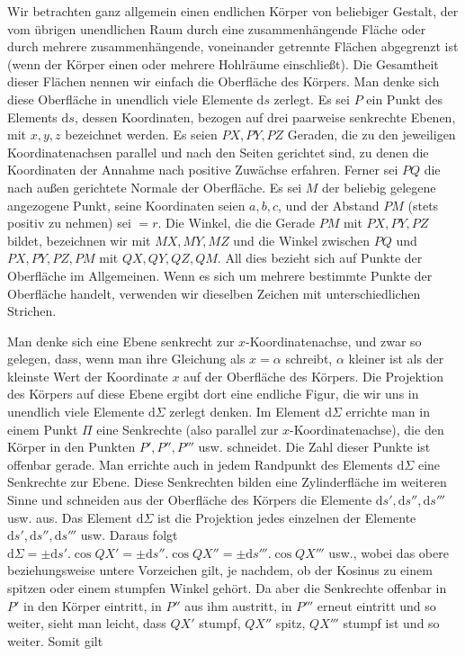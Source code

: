 \par
Wir betrachten ganz allgemein einen endlichen Körper von beliebiger Gestalt, der vom übrigen unendlichen Raum durch eine zusammenhängende Fläche oder durch mehrere zusammenhängende, voneinander getrennte Flächen abgegrenzt ist (wenn der Körper einen oder mehrere Hohlräume einschließt). Die Gesamtheit dieser Flächen nennen wir einfach die Oberfläche des Körpers. Man denke sich diese Oberfläche in unendlich viele Elemente $\mathrm{d}s$ zerlegt. Es sei $P$ ein Punkt des Elements $\mathrm{d}s$, dessen Koordinaten, bezogen auf drei paarweise senkrechte Ebenen, mit $x,y,z$ bezeichnet werden. Es seien $PX,PY,PZ$ Geraden, die zu den jeweiligen Koordinatenachsen parallel und nach den Seiten gerichtet sind, zu denen die Koordinaten der Annahme nach positive Zuwächse erfahren. Ferner sei $PQ$ die nach außen gerichtete Normale der Oberfläche. Es sei $M$ der beliebig gelegene angezogene Punkt, seine Koordinaten seien $a,b,c$, und der Abstand $PM$ (stets positiv zu nehmen) sei $=r$. Die Winkel, die die Gerade $PM$ mit $PX,PY,PZ$ bildet, bezeichnen wir mit $MX,MY,MZ$ und die Winkel zwischen $PQ$ und $PX,PY,PZ,PM$ mit $QX,QY,QZ,QM$. All dies bezieht sich auf Punkte der Oberfläche im Allgemeinen. Wenn es sich um mehrere bestimmte Punkte der Oberfläche handelt, verwenden wir dieselben Zeichen mit unterschiedlichen Strichen.

\par
Man denke sich eine Ebene senkrecht zur $x$-Koordinatenachse, und zwar so gelegen, dass, wenn man ihre Gleichung als $x=\alpha$ schreibt, $\alpha$ kleiner ist als der kleinste Wert der Koordinate $x$ auf der Oberfläche des Körpers. Die Projektion des Körpers auf diese Ebene ergibt dort eine endliche Figur, die wir uns in unendlich viele Elemente $\mathrm{d}\Sigma$ zerlegt denken. Im Element $\mathrm{d}\Sigma$ errichte man in einem Punkt $\Pi$ eine Senkrechte (also parallel zur $x$-Koordinatenachse), die den Körper in den Punkten $P',P'',P'''$ usw. schneidet. Die Zahl dieser Punkte ist offenbar gerade. Man errichte auch in jedem Randpunkt des Elements $\mathrm{d}\Sigma$ eine Senkrechte zur Ebene. Diese Senkrechten bilden eine Zylinderfläche im weiteren Sinne und schneiden aus der Oberfläche des Körpers die Elemente $\mathrm{d}s',\mathrm{d}s'',\mathrm{d}s'''$ usw. aus. Das Element $\mathrm{d}\Sigma$ ist die Projektion jedes einzelnen der Elemente $\mathrm{d}s',\mathrm{d}s'',\mathrm{d}s'''$ usw. Daraus folgt $\mathrm{d}\Sigma=\pm\mathrm{d}s'.\cos QX'=\pm\mathrm{d}s''.\cos QX''=\pm\mathrm{d}s'''.\cos QX'''$ usw., wobei das obere beziehungsweise untere Vorzeichen gilt, je nachdem, ob der Kosinus zu einem spitzen oder einem stumpfen Winkel gehört. Da aber die Senkrechte offenbar in $P'$ in den Körper eintritt, in $P''$ aus ihm austritt, in $P'''$ erneut eintritt und so weiter, sieht man leicht, dass $QX'$ stumpf, $QX''$ spitz, $QX'''$ stumpf ist und so weiter. Somit gilt
